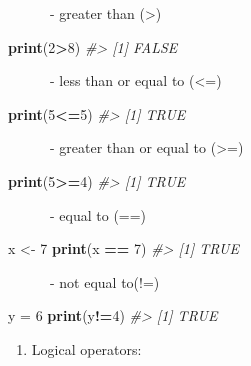 \documentclass[
]{book}
\newenvironment{Shaded}{\begin{snugshade}}{\end{snugshade}}
\newcommand{\CommentTok}[1]{\textcolor[rgb]{0.56,0.35,0.01}{\textit{#1}}}
\newcommand{\DecValTok}[1]{\textcolor[rgb]{0.00,0.00,0.81}{#1}}
\newcommand{\FunctionTok}[1]{\textcolor[rgb]{0.13,0.29,0.53}{\textbf{#1}}}
\newcommand{\NormalTok}[1]{#1}
\newcommand{\OtherTok}[1]{\textcolor[rgb]{0.56,0.35,0.01}{#1}}
\newcommand{\SpecialCharTok}[1]{\textcolor[rgb]{0.81,0.36,0.00}{\textbf{#1}}}
\providecommand{\tightlist}{%
  \setlength{\itemsep}{0pt}\setlength{\parskip}{0pt}}
\begin{document}
~~~~~~- greater than (\textgreater)

\begin{Shaded}
\begin{Highlighting}[]
\FunctionTok{print}\NormalTok{(}\DecValTok{2}\SpecialCharTok{\textgreater{}}\DecValTok{8}\NormalTok{)}
\CommentTok{\#\textgreater{} [1] FALSE}
\end{Highlighting}
\end{Shaded}

~~~~~~- less than or equal to (\textless=)

\begin{Shaded}
\begin{Highlighting}[]
\FunctionTok{print}\NormalTok{(}\DecValTok{5}\SpecialCharTok{\textless{}=}\DecValTok{5}\NormalTok{)}
\CommentTok{\#\textgreater{} [1] TRUE}
\end{Highlighting}
\end{Shaded}

~~~~~~- greater than or equal to (\textgreater=)

\begin{Shaded}
\begin{Highlighting}[]
\FunctionTok{print}\NormalTok{(}\DecValTok{5}\SpecialCharTok{\textgreater{}=}\DecValTok{4}\NormalTok{)}
\CommentTok{\#\textgreater{} [1] TRUE}
\end{Highlighting}
\end{Shaded}

~~~~~~- equal to (==)

\begin{Shaded}
\begin{Highlighting}[]
\NormalTok{x }\OtherTok{\textless{}{-}} \DecValTok{7}
\FunctionTok{print}\NormalTok{(x }\SpecialCharTok{==} \DecValTok{7}\NormalTok{)}
\CommentTok{\#\textgreater{} [1] TRUE}
\end{Highlighting}
\end{Shaded}

~~~~~~- not equal to(!=)

\begin{Shaded}
\begin{Highlighting}[]
\NormalTok{y }\OtherTok{=} \DecValTok{6}
\FunctionTok{print}\NormalTok{(y}\SpecialCharTok{!=}\DecValTok{4}\NormalTok{)}
\CommentTok{\#\textgreater{} [1] TRUE}
\end{Highlighting}
\end{Shaded}

\begin{enumerate}
\def\labelenumi{\arabic{enumi}.}
\setcounter{enumi}{2}
\tightlist
\item
  Logical operators:
\end{enumerate}
\end{document}
